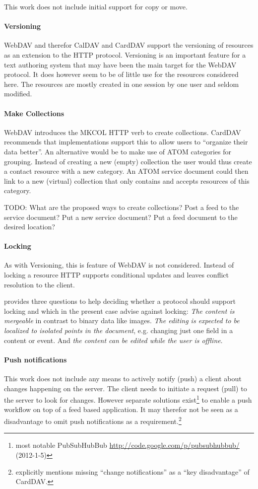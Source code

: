 \documentclass[12pt,a4paper]{scrartcl}		%
\newcommand{\citeurl}[2]{\url{#1} (#2)}
\begin{document}
This work does not include initial support for copy or move.

\paragraph{Versioning}
WebDAV and therefor CalDAV and CardDAV support the versioning of resources as an
extension to the HTTP protocol. Versioning is an important feature for a text
authoring system that may have been the main target for the WebDAV protocol.  It
does however seem to be of little use for the resources considered here. The
resources are mostly created in one session by one user and seldom modified.

\paragraph{Make Collections}
WebDAV introduces the MKCOL HTTP verb to create collections. CardDAV recommends
that implementations support this to allow users to ``organize their data
better''. An alternative would be to make use of ATOM categories for
grouping. Instead of creating a new (empty) collection the user would thus
create a contact resource with a new category. An ATOM service document could
then link to a new (virtual) collection that only contains and accepts resources
of this category.

TODO: What are the proposed ways to create collections?
Post a feed to the service document? Put a new service document? Put a feed document to the desired location?

\paragraph{Locking}
As with Versioning, this is feature of WebDAV is not considered. Instead of
locking a resource HTTP supports conditional updates and leaves conflict
resolution to the client.

\cite[sec. 1]{Nielsen1999} provides three questions to help deciding whether a
protocol should support locking and which in the present case advise against
locking: \textit{The content is mergeable} in contrast to binary data like
images. \textit{The editing is expected to be localized to isolated points in
  the document}, e.g. changing just one field in a content or event. And
\textit{the content can be edited while the user is offline}.

\paragraph{Push notifications}
This work does not include any means to actively notify (push) a client about
changes happening on the server. The client needs to initiate a request (pull)
to the server to look for changes. However separate solutions exist\footnote{most
  notable PubSubHubBub
  \citeurl{http://code.google.com/p/pubsubhubbub/}{2012-1-5}} to enable a push
workflow on top of a feed based
application.\cite{Wilde:2009:FQP:1693155.1693220} It may therefor not be seen as a disadvantage to omit push notifications as a requirement.\footnote{\cite[sec. 1]{RFC6352} explicitly mentions missing ``change notifications'' as a ``key disadvantage'' of CardDAV.}
\end{document}
